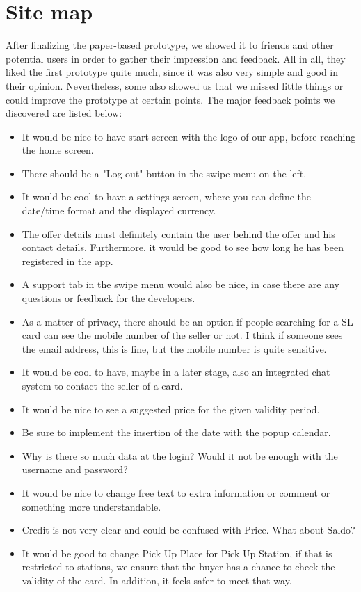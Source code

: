 \documentclass[11pt,twoside,a4paper]{report}
\begin{document}
\section{Site map}

After finalizing the paper-based prototype, we showed it to friends and other potential users in order to gather their impression and feedback. All in all, they liked the first prototype quite much, since it was also very simple and good in their opinion. Nevertheless, some also showed us that we missed little things or could improve the prototype at certain points. The major feedback points we discovered are listed below:

\begin{itemize}
\item It would be nice to have start screen with the logo of our app, before reaching the home screen.
\item There should be a "Log out" button in the swipe menu on the left.
\item It would be cool to have a settings screen, where you can define the date/time format and the displayed currency.
\item The offer details must definitely contain the user behind the offer and his contact details. Furthermore, it would be good to see how long he has been registered in the app.
\item A support tab in the swipe menu would also be nice, in case there are any questions or feedback for the developers.
\item As a matter of privacy, there should be an option if people searching for a SL card can see the mobile number of the seller or not. I think if someone sees the email address, this is fine, but the mobile number is quite sensitive.
\item It would be cool to have, maybe in a later stage, also an integrated chat system to contact the seller of a card.
\item It would be nice to see a suggested price for the given validity period.
\item Be sure to implement the insertion of the date with the popup calendar.
\item Why is there so much data at the login? Would it not be enough with the username and password?
\item It would be nice to change free text to extra information or comment or something more understandable.
\item Credit is not very clear and could be confused with Price. What about Saldo?
\item It would be good to change Pick Up Place for Pick Up Station, if that is restricted to stations, we ensure that the buyer has a chance to check the validity of the card. In addition, it feels safer to meet that way.
\end{itemize}
\end{document}
